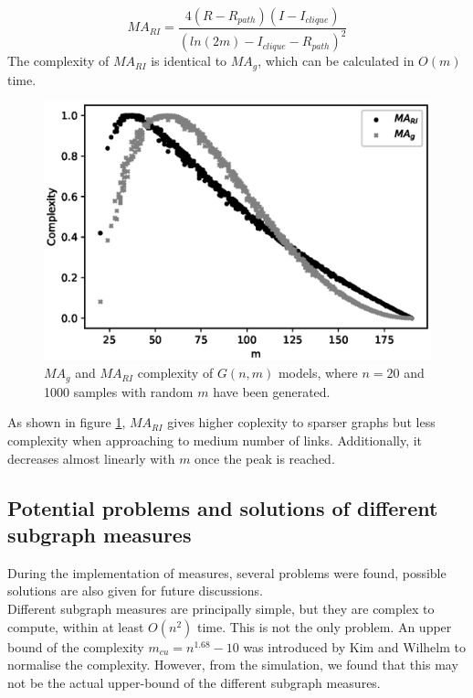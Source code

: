 \documentclass[12pt]{article}
\begin{document}
\begin{equation}
    MA_{RI} = \frac{4(R-R_{path})(I-I_{clique})}{(ln(2m)-I_{clique}-R_{path})^2}
\end{equation}
\noindent
The complexity of $MA_{RI}$ is identical to $MA_g$, which can be calculated in $O(m)$ time.\\
\begin{figure}[ht]
    \label{fig:mariandmag}
    \centering
    \includegraphics[width=\textwidth]{mariandmag.eps}
    \caption{$MA_g$ and $MA_{RI}$ complexity of $G(n,m)$ models, where $n=20$ and 1000 samples with random $m$ have been generated.}
\end{figure}
As shown in figure \ref{fig:mariandmag}, $MA_{RI}$ gives higher coplexity to sparser graphs but less complexity when approaching to medium number of links. Additionally, it decreases almost linearly with $m$ once the peak is reached.

\subsection{Potential problems and solutions of different subgraph measures}
\label{problem}
During the implementation of measures, several problems were found, possible solutions are also given for future discussions.\\
Different subgraph measures are principally simple, but they are complex to compute, within at least $O(n^2)$ time\cite{KIM20082637}. This is not the only problem. An upper bound of the complexity $m_{cu} = n^{1.68}-10$ was introduced by Kim and Wilhelm\cite{KIM20082637} to normalise the complexity. However, from the simulation, we found that this may not be the actual upper-bound of the different subgraph measures.
\end{document}
